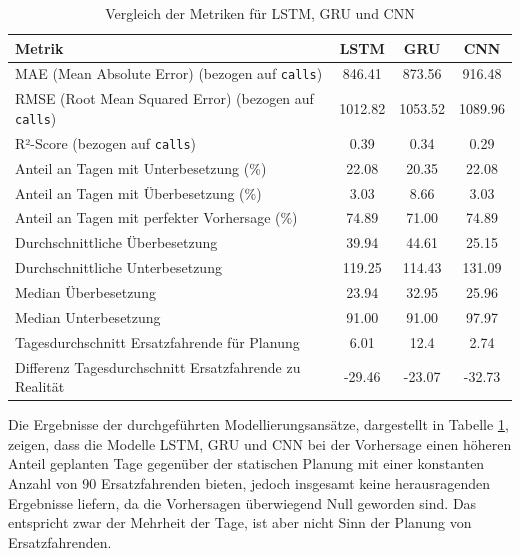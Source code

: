 \documentclass[%
pdftex,
oneside,			%
11pt,				%
parskip=half,		%
headheight = 12pt,	%
headsepline,		%
footsepline,		%
footheight = 16pt,	%
abstracton,		%
DIV=calc,		%
BCOR=8mm,		%
headinclude=false,	%
footinclude=false,	%
listof=totoc,		%
toc=bibliography,	%
]{scrreprt}	%
\begin{document}
            \begin{table}[H]
                \centering
                \begin{tabular}{|l|c|c|c|}
                \hline
                \textbf{Metrik} & \textbf{LSTM} & \textbf{GRU} & \textbf{CNN} \\ \hline
                MAE (Mean Absolute Error) (bezogen auf \texttt{calls}) & 846.41 & 873.56 & 916.48 \\ \hline
                RMSE (Root Mean Squared Error) (bezogen auf \texttt{calls}) & 1012.82 & 1053.52 & 1089.96 \\ \hline
                R²-Score (bezogen auf \texttt{calls}) & 0.39 & 0.34 & 0.29 \\ \hline \hline
                Anteil an Tagen mit Unterbesetzung (\%) & 22.08 & 20.35 & 22.08 \\ \hline
                Anteil an Tagen mit Überbesetzung (\%) & 3.03 & 8.66 & 3.03 \\ \hline
                Anteil an Tagen mit perfekter Vorhersage (\%) & 74.89 & 71.00 & 74.89 \\ \hline
                Durchschnittliche Überbesetzung & 39.94 & 44.61 & 25.15 \\ \hline
                Durchschnittliche Unterbesetzung & 119.25 & 114.43 & 131.09 \\ \hline
                Median Überbesetzung & 23.94 & 32.95 & 25.96 \\ \hline
                Median Unterbesetzung & 91.00 & 91.00 & 97.97 \\ \hline
                Tagesdurchschnitt Ersatzfahrende für Planung & 6.01 & 12.4 & 2.74 \\ \hline
                Differenz Tagesdurchschnitt Ersatzfahrende zu Realität & -29.46 & -23.07 & -32.73 \\ \hline
                \end{tabular}
                \caption{Vergleich der Metriken für LSTM, GRU und CNN}
                \label{tab:model_comparison}
            \end{table}
            
            Die Ergebnisse der durchgeführten Modellierungsansätze, dargestellt in Tabelle \ref{tab:model_comparison}, zeigen, dass die Modelle LSTM, GRU und CNN bei der Vorhersage einen höheren Anteil geplanten Tage gegenüber der statischen Planung mit einer konstanten Anzahl von 90 Ersatzfahrenden bieten, jedoch insgesamt keine herausragenden Ergebnisse liefern, da die Vorhersagen überwiegend Null geworden sind.
            Das entspricht zwar der Mehrheit der Tage, ist aber nicht Sinn der Planung von Ersatzfahrenden.
\end{document}
